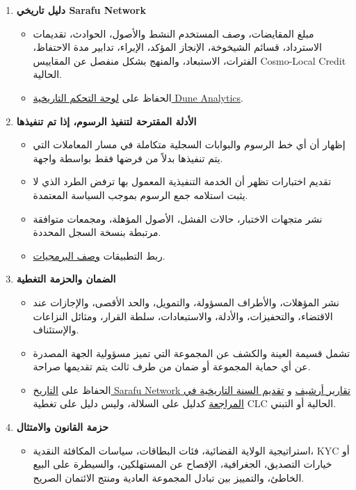 \documentclass[11pt]{article}
\begin{document}
\begin{enumerate}[leftmargin=*]
\item \textbf{دليل تاريخي Sarafu Network}
\begin{itemize}[leftmargin=*]
\item مبلغ المقايضات، وصف المستخدم النشط والأصول، الحوادث، تقديمات الاسترداد، قسائم الشيخوخة، الإنجاز المؤكد، الإبراء، تدابير مدة الاحتفاظ، الفترات، الاستبعاد، والمنهج بشكل منفصل عن المقاييس Cosmo-Local Credit الحالية.
\item الحفاظ على \href{https://dune.com/grassrootseconomics/sarafu-network}{لوحة التحكم التاريخية Dune Analytics}.
\end{itemize}
\item \textbf{الأدلة المقترحة لتنفيذ الرسوم، إذا تم تنفيذها}
\begin{itemize}[leftmargin=*]
\item إظهار أن أي خط الرسوم والبوابات السجلية متكاملة في مسار المعاملات التي يتم تنفيذها بدلاً من فرضها فقط بواسطة واجهة.
\item تقديم اختبارات تظهر أن الخدمة التنفيذية المعمول بها ترفض الطرد الذي لا يثبت استلامه جمع الرسوم بموجب السياسة المعتمدة.
\item نشر متجهات الاختبار، حالات الفشل، الأصول المؤهلة، ومجمعات متوافقة مرتبطة بنسخة السجل المحددة.
\item ربط التطبيقات \href{https://software.grassecon.org}{وصف البرمجيات}.
\end{itemize}
\item \textbf{الضمان والحزمة التغطية}
\begin{itemize}[leftmargin=*]
\item نشر المؤهلات، والأطراف المسؤولة، والتمويل، والحد الأقصى، والإجازات عند الاقتضاء، والتحفيزات، والأدلة، والاستبعادات، سلطة القرار، ومثائل النزاعات والإستئناف.
\item تشمل قسيمة العينة والكشف عن المجموعة التي تميز مسؤولية الجهة المصدرة عن أي حماية المجموعة أو ضمان من طرف ثالث يتم تقديمها صراحة.
\item الحفاظ على \href{https://sarafu.network/reports}{التاريخ Sarafu Network تقارير أرشيف} و \href{https://youtu.be/5yGaP31bvs0?si=fZ-AMTEXsmVR8Ulv}{تقديم السنة التاريخية في المراجعة} كدليل على السلالة، وليس دليل على تغطية CLC الحالية أو التبني.
\end{itemize}
\item \textbf{حزمة القانون والامتثال}
\begin{itemize}[leftmargin=*]
\item استراتيجية الولاية القضائية، فئات البطاقات، سياسات المكافئة النقدية، KYC أو خيارات التصديق، الجغرافية، الإفصاح عن المستهلكين، والسيطرة على البيع الخاطئ، والتمييز بين تبادل المجموعة العادية ومنتج الائتمان الصريح.

\end{itemize}
\end{enumerate}
\end{document}
